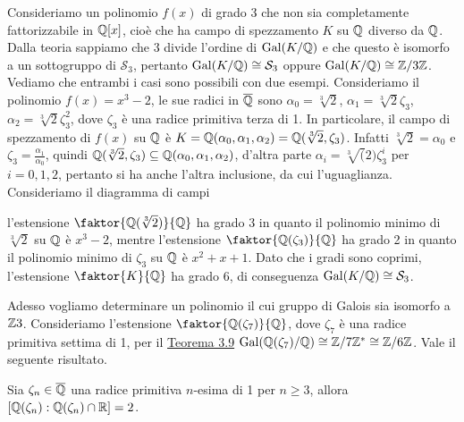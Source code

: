 \documentclass[11pt]{scrartcl}
\begin{document}
	Consideriamo un polinomio $f(x)$ di grado 3 che non sia completamente fattorizzabile 
	in $\mathbb Q[x]$, cioè che ha campo di spezzamento $K$ 
	su $\mathbb Q$ diverso da $\mathbb Q$. Dalla teoria sappiamo che 3 divide l'ordine di 
	$\operatorname{Gal}(K/\mathbb Q)$ e che questo è isomorfo a un sottogruppo di 
	$\mathcal{S}_3$, pertanto $\operatorname{Gal}(K/\mathbb Q) \cong \mathcal{S}_3$ oppure $\operatorname{Gal}(K/\mathbb Q) \cong \mathbb{Z}/{3}\mathbb{Z}$. 
	Vediamo che entrambi i casi sono possibili con due esempi.
	\newline
	Consideriamo il polinomio $f(x) = x^3 - 2$, le sue radici in $\overline{\mathbb Q}$ sono 
	$\alpha_0 = \sqrt[3]{2}$, $\alpha_1 = \sqrt[3]2 \zeta_3$,
	$\alpha_2 = \sqrt[3]2\zeta_3^2$, dove $\zeta_3$ è una radice primitiva terza 
	di 1. In particolare, il campo di spezzamento di $f(x)$ su $\mathbb Q$
	è $K = \mathbb Q(\alpha_0, \alpha_1, \alpha_2) = \mathbb Q(\sqrt[3]2, \zeta_3)$. Infatti 
	$\sqrt[3]2 = \alpha_0$ e $\zeta_3 = \frac{\alpha_1}{\alpha_0}$,
	quindi $\mathbb Q(\sqrt[3]2, \zeta_3) \subseteq \mathbb Q(\alpha_0, \alpha_1, \alpha_2)$, 
	d'altra parte $\alpha_i = \sqrt[3](2)\zeta_3^i$ per 
	$i = 0, 1, 2$, pertanto si ha anche l'altra inclusione, da cui l'uguaglianza. 
	Consideriamo il diagramma di campi 
	\begin{center}
	\end{center}
	l'estensione $\faktor{\QQ(\sqrt[3]2)}{\QQ}$ ha grado 3 in quanto il 
	polinomio minimo di $\sqrt[3]2$ su $\mathbb Q$ è $x^3 - 2$, mentre 
	l'estensione $\faktor{\QQ(\zeta_3)}{\QQ}$ ha grado 2 in quanto il polinomio
	minimo di $\zeta_3$ su $\mathbb Q$ è $x^2 + x + 1$. Dato 
	che i gradi sono coprimi, l'estensione $\faktor{K}{\QQ}$ ha grado 6, di 
	conseguenza $\operatorname{Gal}(K/\mathbb Q) \cong \mathcal{S}_3$.
	\newline
	
	Adesso vogliamo determinare un polinomio il cui gruppo di Galois sia 
	isomorfo a $\mathbb Z3$. Consideriamo l'estensione $\faktor{\QQ(\zeta_7)}{\QQ}$,
	dove $\zeta_7$ è una radice primitiva settima di 1, per il 
	\hyperref[teorema3.9]{Teorema 3.9} $\operatorname{Gal}(\mathbb Q(\zeta_7)/\mathbb Q) \cong \mathbb{Z}/{7}\mathbb{Z}^* \cong \mathbb{Z}/{6}\mathbb{Z}$.
	Vale il seguente risultato.
	
	\begin{proposition}
		Sia $\zeta_n \in \overline{\mathbb Q}$ una radice primitiva $n$-esima di 1 per $n \geq 3$,
		allora $[\mathbb Q(\zeta_n):\mathbb Q(\zeta_n)\cap \mathbb R] = 2$.
	\end{proposition}
	
\end{document}
